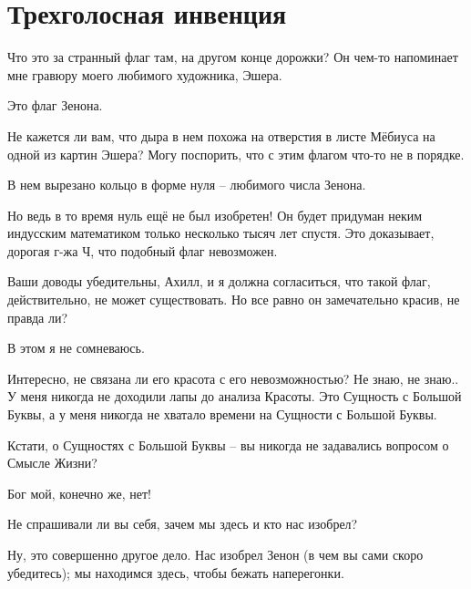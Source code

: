 \documentclass[../main.tex]{subfiles}
\begin{document}
\section{Трехголосная инвенция}


\begin{Dialogue}

 Что это за странный флаг там, на другом конце дорожки? Он чем-то напоминает мне гравюру моего любимого художника, Эшера.

 Это флаг Зенона.

 Не кажется ли вам, что дыра в нем похожа на отверстия в листе Мёбиуса на одной из картин Эшера? Могу поспорить, что с этим флагом что-то не в порядке.

 В нем вырезано кольцо в форме нуля \--- любимого числа Зенона.

 Но ведь в то время нуль ещё не был изобретен! Он будет придуман неким индусским математиком только несколько тысяч лет спустя. Это доказывает, дорогая г-жа Ч, что подобный флаг невозможен.

 Ваши доводы убедительны, Ахилл, и я должна согласиться, что такой флаг, действительно, не может существовать. Но все равно он замечательно красив, не правда ли?

 В этом я не сомневаюсь.

 Интересно, не связана ли его красота с его невозможностью? Не знаю, не знаю.. У меня никогда не доходили лапы до анализа Красоты. Это Сущность с Большой Буквы, а у меня никогда не хватало времени на Сущности с Большой Буквы.

 Кстати, о Сущностях с Большой Буквы \--- вы никогда не задавались вопросом о Смысле Жизни?

 Бог мой, конечно же, нет!

 Не спрашивали ли вы себя, зачем мы здесь и кто нас изобрел?

 Ну, это совершенно другое дело. Нас изобрел Зенон (в чем вы сами скоро убедитесь); мы находимся здесь, чтобы бежать наперегонки.


\end{Dialogue}
\end{document}
